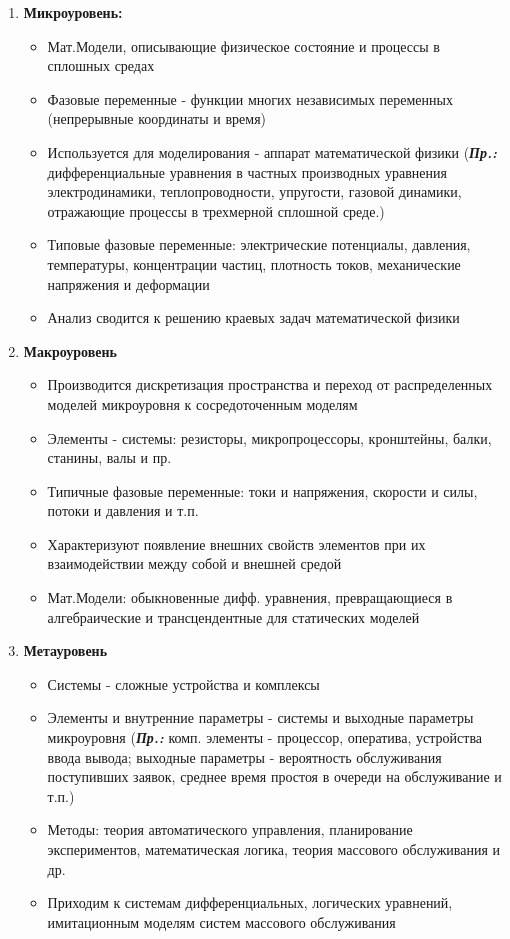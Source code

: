 	\begin{enumerate}
		\item \textbf{Микроуровень:}
		\begin{itemize}
			\item Мат.Модели, описывающие физическое состояние и процессы в сплошных средах
			\item Фазовые переменные - функции многих независимых переменных (непрерывные 
			координаты и время)
			\item Используется для моделирования - аппарат математической физики
			\newline
			(\textbf{\textit{Пр.:}} дифференциальные уравнения в частных производных уравнения электродинамики, теплопроводности, упругости, газовой динамики, отражающие процессы в трехмерной сплошной среде.)
			\item Типовые фазовые переменные: электрические потенциалы, давления, температуры, 
			концентрации частиц, плотность токов, механические напряжения и деформации
			\item Анализ сводится к решению краевых задач математической физики
		\end{itemize}
		\item \textbf{Макроуровень}
		\begin{itemize}
			\item Производится дискретизация пространства и переход от распределенных моделей микроуровня к сосредоточенным моделям
			\item Элементы - системы: резисторы, микропроцессоры, кронштейны, балки, станины, валы и пр.
			\item Типичные фазовые переменные: токи и напряжения, скорости и силы, потоки и давления и т.п.
			\item Характеризуют появление внешних свойств элементов при их взаимодействии между собой и внешней средой
			\item Мат.Модели: обыкновенные дифф. уравнения, превращающиеся в алгебраические и трансцендентные для статических моделей
		\end{itemize}
		\item \textbf{Метауровень}
		\begin{itemize}
			\item Системы - сложные устройства и комплексы
			\item Элементы и внутренние параметры - системы и выходные параметры микроуровня
			\newline 
			(\textbf{\textit{Пр.:}} комп. элементы - процессор, оператива, устройства ввода вывода; выходные параметры - вероятность обслуживания поступивших заявок, среднее время простоя в очереди на обслуживание и т.п.)
			\item Методы: теория автоматического управления, планирование экспериментов, математическая логика, теория массового обслуживания и др.
			\item Приходим к системам дифференциальных, логических уравнений, имитационным моделям систем массового обслуживания
		\end{itemize}
	\end{enumerate}
	\newpage
